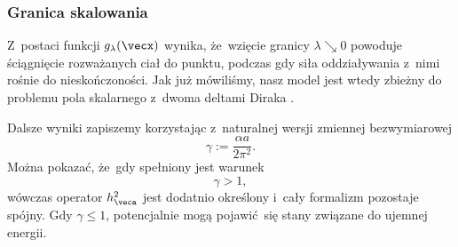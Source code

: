\documentclass[10pt,t]{beamer}
\begin{document}
\begin{frame}
  \frametitle{Granica skalowania}


  Z~postaci funkcji $g_{ \lambda }( \vecx )$ wynika, że~wzięcie granicy $\lambda \searrow 0$
  powoduje ściągnięcie rozważanych ciał do punktu, podczas gdy siła
  oddziaływania z~nimi rośnie do nieskończoności. Jak już mówiliśmy, nasz
  model jest wtedy zbieżny do problemu pola skalarnego z~dwoma deltami
  Diraka
  \parencite{Albeverio-et-al-Solvable-Models-in-Quantum-Mechanics-Pub-1988}.

  Dalsze wyniki zapiszemy korzystając z~naturalnej wersji zmiennej
  bezwymiarowej
  \begin{equation}
    \label{eq:Pole-skalarne-ETC-07}
    \gamma := \frac{ \alpha a }{ 2 \pi^{ 2 } }.
  \end{equation}
  Można pokazać, że~gdy spełniony jest warunek
  \begin{equation}
    \label{eq:Pole-skalarne-08}
    \gamma > 1,
  \end{equation}
  wówczas operator $h_{ \veca }^{ 2 }$ jest dodatnio określony i~cały
  formalizm pozostaje spójny. Gdy $\gamma \leq 1$, potencjalnie mogą pojawić~się
  stany związane do ujemnej energii.

\end{frame}
\end{document}
